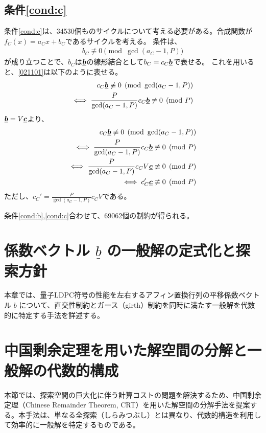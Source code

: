 \documentclass[a4paper,11pt,dvipdfmx]{jsarticle}
\theoremstyle{definition}
\begin{document}
\subsection{条件\ref{cond:c}}
条件\ref{cond:c}は、34530個ものサイクルについて考える必要がある。合成関数が$f_C(x) = a_C x + b_C$であるサイクルを考える。
条件は、
\begin{align}
  b_C \not\equiv 0 \pmod{\gcd(a_C-1, P)}\label{021101}
\end{align}
が成り立つことで、$b_C$は$\underline{\bm{b}}$の線形結合として$b_C = c_C \underline{\bm{b}}$で表せる。
これを用いると、\eqref{021101}は以下のように表せる。
\begin{align}
  c_C\underline{\bm{b}} \not\equiv 0 \pmod{\gcd(a_C-1, P)}\label{021102}\\
  \iff \frac{P}{\gcd(a_C-1, P)}c_C\underline{\bm{b}} \not\equiv 0 \pmod{P}\label{021103}
\end{align}
$\underline{\bm{b}} = V\underline{\bm{c}}$より、
\begin{align}
  c_C\underline{\bm{b}} \not\equiv 0 \pmod{\gcd(a_C-1, P)}\label{021104}\\
  \iff \frac{P}{\gcd(a_C-1, P)}c_C\underline{\bm{b}} \not\equiv 0 \pmod{P}\label{021105}\\
  \iff \frac{P}{\gcd(a_C-1, P)}c_C V\underline{\bm{c}} \not\equiv 0 \pmod{P}\label{021106}\\
  \iff c_C'\underline{\bm{c}} \not\equiv 0 \pmod{P}\label{021107}
\end{align}
ただし、$c_C' = \frac{P}{\gcd(a_C-1, P)}c_C V$である。

条件\ref{cond:b},\ref{cond:c}合わせて、69062個の制約が得られる。

\section{係数ベクトル $\underline{b}$ の一般解の定式化と探索方針}

本章では、量子LDPC符号の性能を左右するアフィン置換行列の平移係数ベクトル $\underline{b}$ について、直交性制約とガース（girth）制約を同時に満たす一般解を代数的に特定する手法を詳述する。

\section{中国剰余定理を用いた解空間の分解と一般解の代数的構成}

本節では、探索空間の巨大化に伴う計算コストの問題を解決するため、中国剰余定理（Chinese Remainder Theorem, CRT）を用いた解空間の分解手法を提案する。本手法は、単なる全探索（しらみつぶし）とは異なり、代数的構造を利用して効率的に一般解を特定するものである。
\end{document}
